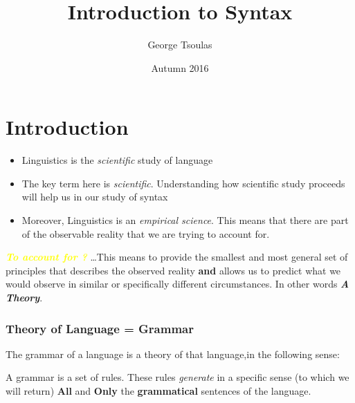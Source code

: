 


\title{Introduction to Syntax}
\date{Autumn 2016}
\author{George Tsoulas}



\maketitle


\section{Introduction}
\begin{frame}[fragile]
  \begin{itemize}
  \item Linguistics is the \emph{scientific} study of language \pause
  \item The key term here is \emph{scientific}. Understanding how scientific study proceeds will help us in our study of syntax \pause
  \item Moreover, Linguistics is an \emph{empirical science}.  This means that there are part of the observable reality that we are trying to account for.
  \end{itemize}
\end{frame}


\begin{frame}[fragile]
\textcolor{yellow}{\textbf{\textit{To account for ?}}}  \ldots \pause  This means to provide the smallest and most general set of principles that describes the observed reality \textbf{and} allows us to predict what we would observe in similar or specifically different circumstances.  In other words \textit{\textbf{A Theory}}.
  
\end{frame}

\begin{frame}
  \frametitle{Theory of Language = Grammar}

The grammar of a language is a theory of that language,in the following sense:

\pause
A grammar is a set of rules.  These rules \textit{generate} in a specific sense (to which we will return) \textbf{All} and \textbf{Only} the \textbf{grammatical} sentences of the language.



\end{frame}


